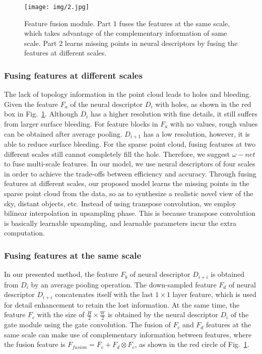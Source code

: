 \documentclass[sigconf]{acmart}
\begin{document}
 








\begin{figure}[h]
  \centering
  \texttt{[image: img/2.jpg]}
  \caption{Feature fusion module. Part 1 fuses the features at the same scale, which takes advantage of the complementary information of same scale. Part 2 learns missing points in neural descriptors by fusing the features at different scales.}
    \label{fig:label4}
\end{figure}

\subsubsection{Fusing features at different scales}
The lack of topology information in the point cloud leads to holes and bleeding. Given the feature $F_a$ of the neural descriptor $D_{i}$ with holes, as shown in the red box in Fig.~\ref{fig:label4}. Although $D_{i}$ has a higher resolution with fine details, it still suffers from larger surface bleeding. For feature blocks in $F_a$ with no values, rough values can be obtained after average pooling. $D_{i+1}$ has a low resolution, however, it is able to reduce surface bleeding. For the sparse point cloud, fusing features at two different scales still cannot completely fill the hole. Therefore, we suggest $\omega-net$ to fuse multi-scale features. In our model, we use neural descriptors of four scales in order to achieve the trade-offs between efficiency and accuracy. Through fusing features at different scales, our proposed model learns the missing points in the sparse point cloud from the data, so as to synthesize a realistic novel view of the sky, distant objects, etc. Instead of using transpose convolution, we employ bilinear interpolation in upsampling phase. This is because transpose convolution is basically learnable upsampling, and learnable parameters incur the extra computation.




\subsubsection{Fusing features at the same scale}
In our presented method, the feature $F_b$ of neural descriptor $D_{i+i}$ is obtained from $D_{i}$ by an average pooling operation. The down-sampled feature $F_d$ of neural descriptor $D_{i+i}$ concatenates itself with the last $1 \times 1$ layer feature, which is used for detail enhancement to retain the lost information. At the same time, the feature $F_c$ with the size of $\frac{H}{2} \times \frac{W}{2}$ is obtained by the neural descriptor $D_{i}$ of the gate module using the gate convolution. The fusion of $F_c$ and $F_d$ features at the same scale can make use of complementary information between features, where the fusion feature is $F_{fusion}=F_c+F_d\otimes F_c$, as shown in the red circle of Fig.~\ref{fig:label4}.
\end{document}
